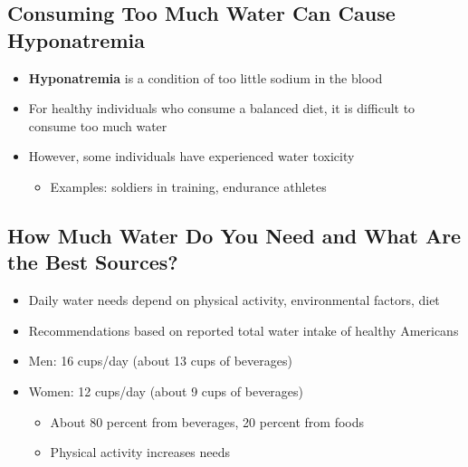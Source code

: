 \documentclass[12pt]{article}
\begin{document}
        \subsection{Consuming Too Much Water Can Cause Hyponatremia}
            \begin{itemize}
                \item \textbf{Hyponatremia} is a condition of too little sodium in the blood
                \item For healthy individuals who consume a balanced diet, it is difficult to consume too much water
                \item However, some individuals have experienced water toxicity
                    \begin{itemize}
                        \item Examples: soldiers in training, endurance athletes
                    \end{itemize}
            \end{itemize}

        \subsection{How Much Water Do You Need and What Are the Best Sources?}
            \begin{itemize}
                \item Daily water needs depend on physical activity, environmental factors, diet
                \item Recommendations based on reported total water intake of healthy Americans
                \item Men: 16 cups/day (about 13 cups of beverages)
                \item Women: 12 cups/day (about 9 cups of beverages)
                    \begin{itemize}
                        \item About 80 percent from beverages, 20 percent from foods
                        \item Physical activity increases needs
                    \end{itemize}
            \end{itemize}
\end{document}
